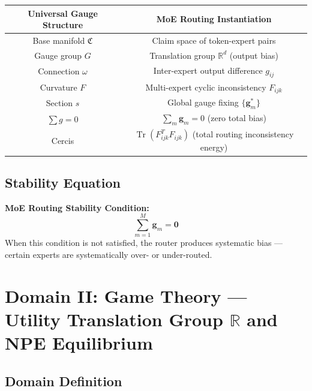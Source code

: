 \documentclass[12pt,a4paper]{article}
\theoremstyle{plain}
\theoremstyle{definition}
\newcommand{\R}{\mathbb{R}}
\newcommand{\curv}{F}
\newcommand{\conn}{\omega}
\newcommand{\ClaimSpace}{\mathfrak{C}}
\DeclareMathOperator{\Tr}{Tr}
\begin{document}
\begin{center}
\begin{tabular}{c|c}
    \toprule
    \textbf{Universal Gauge Structure} & \textbf{MoE Routing Instantiation} \\
    \midrule
    Base manifold $\ClaimSpace$ & Claim space of token-expert pairs \\
    Gauge group $G$ & Translation group $\R^d$ (output bias) \\
    Connection $\conn$ & Inter-expert output difference $g_{ij}$ \\
    Curvature $\curv$ & Multi-expert cyclic inconsistency $F_{ijk}$ \\
    Section $s$ & Global gauge fixing $\{\mathbf{g}_m^*\}$ \\
    $\sum g = 0$ & $\sum_m \mathbf{g}_m = 0$ (zero total bias) \\
    Cercis & $\Tr(F_{ijk}^T F_{ijk})$ (total routing inconsistency energy) \\
    \bottomrule
\end{tabular}
\end{center}

\subsection{Stability Equation}

\begin{keyeq}
\textbf{MoE Routing Stability Condition:}
\begin{equation}
    \boxed{\sum_{m=1}^{M} \mathbf{g}_m = \mathbf{0}}
\end{equation}
When this condition is not satisfied, the router produces systematic bias — certain experts are systematically over- or under-routed.
\end{keyeq}

\newpage


\section{Domain II: Game Theory — Utility Translation Group $\R$ and NPE Equilibrium}

\subsection{Domain Definition}
\end{document}
